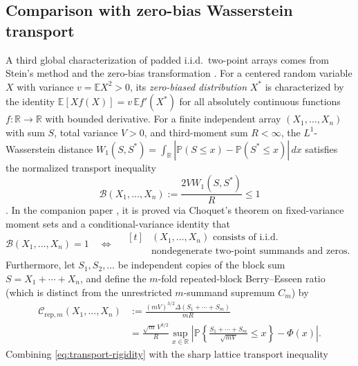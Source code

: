 \documentclass[11pt]{article}
\numberwithin{equation}{section}
\theoremstyle{definition}
\theoremstyle{remark}
\newcommand{\E}{\mathbb E}
\newcommand{\Pp}{\mathbb P}
\newcommand{\R}{\mathbb R}
\begin{document}
\subsection{Comparison with zero-bias Wasserstein transport}\label{subsec:transport-comparison}

A third global characterization of padded i.i.d.\ two-point arrays comes from
Stein's method and the zero-bias transformation \citep{GoldsteinReinert1997}.
For a centered random variable $X$ with variance $v=\E X^2>0$, its
\emph{zero-biased distribution} $X^*$ is characterized by the identity
$\E[Xf(X)]=v\,\E f'(X^*)$ for all absolutely continuous functions $f:\R\to\R$
with bounded derivative. For a finite independent array $(X_1,\ldots,X_n)$
with sum $S$, total variance $V>0$, and third-moment sum $R<\infty$, the
$L^1$-Wasserstein distance $W_1(S,S^*)=\int_\R|\Pp(S\le x)-\Pp(S^*\le x)|\,dx$
satisfies the normalized transport inequality
\begin{equation}\label{eq:transport-ineq}
 \mathcal B(X_1,\ldots,X_n):=\frac{2VW_1(S,S^*)}{R}\le 1
\end{equation}
\citep{Goldstein2010,Tyurin2009}. In the companion paper
\citet[Theorem~1.1]{BellTransport2026}, it is proved via Choquet's theorem on
fixed-variance moment sets and a conditional-variance identity that
\begin{equation}\label{eq:transport-rigidity}
 \mathcal B(X_1,\ldots,X_n)=1
 \quad\Longleftrightarrow\quad
 \begin{aligned}[t]
 &(X_1,\ldots,X_n)\text{ consists of i.i.d.}\\
 &\text{nondegenerate two-point summands and zeros.}
 \end{aligned}
\end{equation}
Furthermore, let $S_1,S_2,\ldots$ be independent copies of the block sum
$S=X_1+\cdots+X_n$, and define the $m$-fold repeated-block Berry--Esseen
ratio (which is distinct from the unrestricted $m$-summand supremum $C_m$) by
\begin{equation}\label{eq:repeated-block-def}
\begin{aligned}
 \mathcal C_{\mathrm{rep},m}(X_1,\ldots,X_n)
 &:=\frac{(mV)^{3/2}\Delta(S_1+\cdots+S_m)}{mR}\\
 &=\frac{\sqrt m\,V^{3/2}}{R}\sup_{x\in\R}\left|\Pp\left\{\frac{S_1+\cdots+S_m}{\sqrt{mV}}\le x\right\}-\Phi(x)\right|.
\end{aligned}
\end{equation}
Combining \eqref{eq:transport-rigidity} with the sharp lattice transport
inequality
\end{document}
